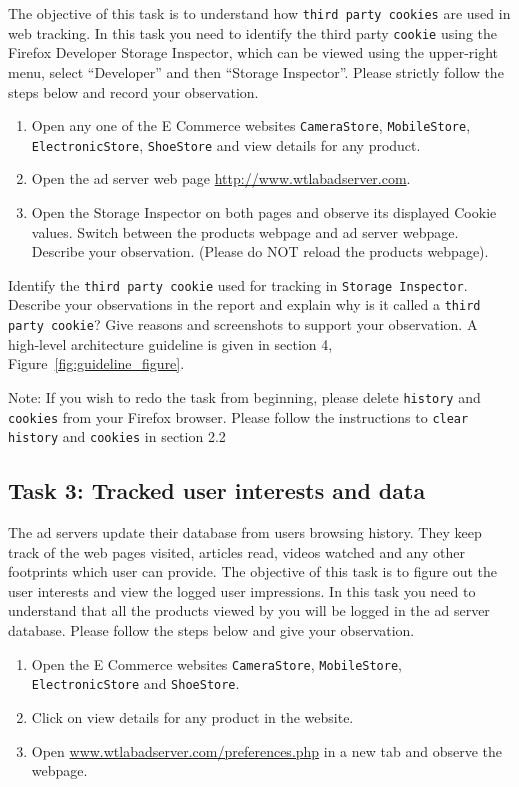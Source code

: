 The objective of this task is to understand how {\tt third party cookies} are used in web tracking. 
In this task you need to identify the third party {\tt cookie} using the Firefox Developer Storage Inspector, which can be viewed using
the upper-right menu, select ``Developer'' and then ``Storage Inspector''. 
Please strictly follow the steps below and record your observation.

\begin{enumerate}
  \item Open any one of the E Commerce websites {\tt CameraStore}, {\tt MobileStore}, {\tt ElectronicStore}, {\tt ShoeStore} and view details for any product.
  \item Open the ad server web page \url{ http://www.wtlabadserver.com}.
  \item Open the Storage Inspector on both pages and observe its displayed Cookie values. Switch between the products webpage and ad server webpage. 
	Describe your observation. (Please do NOT reload the products webpage).
\end{enumerate}

Identify the {\tt third party cookie} used for tracking in {\tt Storage Inspector}. 
Describe your observations in the report and explain why is it called a {\tt third party cookie}? 
Give reasons and screenshots to support your observation. 
A high-level architecture guideline is given in section 4, Figure~\ref{fig:guideline_figure}.

Note: If you wish to redo the task from beginning, please delete {\tt history} and {\tt cookies} from your Firefox browser. 
Please follow the instructions to {\tt clear history} and {\tt cookies} in section 2.2

\subsection{Task 3: Tracked user interests and data}


The ad servers update their database from users browsing history. 
They keep track of the web pages visited, articles read, videos watched and any other footprints which user can provide. 
The objective of this task is to figure out the user interests and view the logged user impressions. 
In this task you need to understand that all the products viewed by you will be logged in the ad server database. 
Please follow the steps below and give your observation.

\begin{enumerate}
  \item Open the E Commerce websites {\tt CameraStore}, {\tt MobileStore}, {\tt ElectronicStore} and {\tt ShoeStore}.
  \item Click on view details for any product in the website.
  \item Open \url{www.wtlabadserver.com/preferences.php} in a new tab and observe the webpage. 
\end{enumerate}

